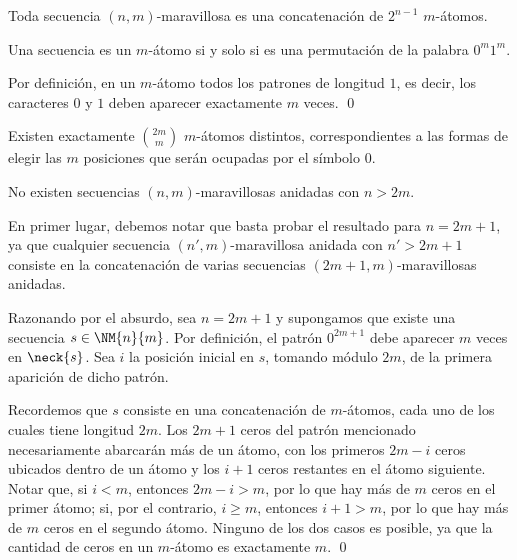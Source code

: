 \begin{obs}
  Toda secuencia $(n,m)$-maravillosa es una concatenación de $2^{n-1}$
  $m$-átomos.
\end{obs}



\begin{lema}
  Una secuencia es un $m$-átomo si y solo si es una permutación de la palabra
  $0^m1^m$.
\end{lema}

\begin{demo}
  Por definición, en un $m$-átomo todos los patrones de longitud $1$, es
  decir, los caracteres $0$ y $1$ deben aparecer exactamente $m$ veces. \qed
\end{demo}

\begin{coro}
  Existen exactamente $\binom{2m}{m}$ $m$-átomos distintos, correspondientes a
  las formas de elegir las $m$ posiciones que serán ocupadas por el símbolo
  $0$.
\end{coro}

\begin{prop}
  No existen secuencias $(n,m)$-maravillosas anidadas con $n > 2m$.
\end{prop}

\begin{demo}
  En primer lugar, debemos notar que basta probar el resultado para $n = 2m +
    1$, ya que cualquier secuencia $(n',m)$-maravillosa anidada con $n' > 2m +
    1$ consiste en la concatenación de varias secuencias
  $(2m+1,m)$-maravillosas anidadas.

  Razonando por el absurdo, sea $n = 2m + 1$ y supongamos que existe una
  secuencia $s \in \NM{n}{m}$. Por definición, el patrón $0^{2m+1}$ debe
  aparecer $m$ veces en $\neck{s}$. Sea $i$ la posición inicial en $s$, tomando
  módulo $2m$, de la primera aparición de dicho patrón.

  Recordemos que $s$ consiste en una concatenación de $m$-átomos, cada uno de
  los cuales tiene longitud $2m$. Los $2m+1$ ceros del patrón mencionado
  necesariamente abarcarán más de un átomo, con los primeros $2m - i$ ceros
  ubicados dentro de un átomo y los $i + 1$ ceros restantes en el átomo
  siguiente. Notar que, si $i < m$, entonces $2m - i > m$, por lo que hay más
  de $m$ ceros en el primer átomo; si, por el contrario, $i \geq m$, entonces
  $i + 1 > m$, por lo que hay más de $m$ ceros en el segundo átomo. Ninguno
  de los dos casos es posible, ya que la cantidad de ceros en un $m$-átomo es
  exactamente $m$. \qed
\end{demo}

